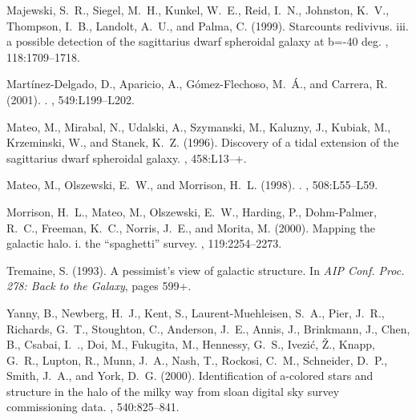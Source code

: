 \begin{thebibliography}{}
{Majewski}, S.~R., {Siegel}, M.~H., {Kunkel}, W.~E., {Reid}, I.~N., {Johnston},
  K.~V., {Thompson}, I.~B., {Landolt}, A.~U., and {Palma}, C. (1999).
\newblock Starcounts redivivus. iii. a possible detection of the sagittarius
  dwarf spheroidal galaxy at b=-40 deg.
\newblock {\em \aj}, 118:1709--1718.

{Mart{\' i}nez-Delgado}, D., {Aparicio}, A., {G{\' o}mez-Flechoso}, M.~{\' A}.,
  and {Carrera}, R. (2001).
.
\newblock {\em \apjl}, 549:L199--L202.

{Mateo}, M., {Mirabal}, N., {Udalski}, A., {Szymanski}, M., {Kaluzny}, J.,
  {Kubiak}, M., {Krzeminski}, W., and {Stanek}, K.~Z. (1996).
\newblock Discovery of a tidal extension of the sagittarius dwarf spheroidal
  galaxy.
\newblock {\em \apjl}, 458:L13--+.

{Mateo}, M., {Olszewski}, E.~W., and {Morrison}, H.~L. (1998).
.
\newblock {\em \apjl}, 508:L55--L59.

{Morrison}, H.~L., {Mateo}, M., {Olszewski}, E.~W., {Harding}, P.,
  {Dohm-Palmer}, R.~C., {Freeman}, K.~C., {Norris}, J.~E., and {Morita}, M.
  (2000).
\newblock Mapping the galactic halo. i. the ``spaghetti'' survey.
\newblock {\em \aj}, 119:2254--2273.

{Tremaine}, S. (1993).
\newblock A pessimist's view of galactic structure.
\newblock In {\em AIP Conf. Proc. 278: Back to the Galaxy}, pages 599+.

{Yanny}, B., {Newberg}, H.~J., {Kent}, S., {Laurent-Muehleisen}, S.~A., {Pier},
  J.~R., {Richards}, G.~T., {Stoughton}, C., {Anderson}, J.~E., {Annis}, J.,
  {Brinkmann}, J., {Chen}, B., {Csabai}, I.~., {Doi}, M., {Fukugita}, M.,
  {Hennessy}, G.~S., {Ivezi{\' c}}, {\v Z}., {Knapp}, G.~R., {Lupton}, R.,
  {Munn}, J.~A., {Nash}, T., {Rockosi}, C.~M., {Schneider}, D.~P., {Smith},
  J.~A., and {York}, D.~G. (2000).
\newblock Identification of a-colored stars and structure in the halo of the
  milky way from sloan digital sky survey commissioning data.
\newblock {\em \apj}, 540:825--841.

\end{thebibliography}










